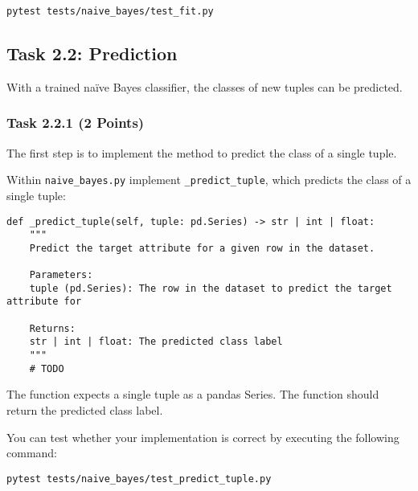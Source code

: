 \documentclass[
english,
smallborders
]{i6prcsht}
\newcommand{\points}[1]{\hfill \color{red}(#1 Points)\color{black}}
\begin{document}
\vspace*{0.3cm}

\begin{lstlisting}
pytest tests/naive_bayes/test_fit.py
\end{lstlisting}

\vspace*{0.1cm}

\subsection*{Task 2.2: Prediction}

With a trained naïve Bayes classifier, the classes of new tuples can be predicted.

\subsubsection*{Task 2.2.1 \points{2}}

The first step is to implement the method to predict the class of a single tuple.

Within \texttt{naive\_bayes.py} implement \texttt{\_predict\_tuple}, which predicts the class of a single tuple:

\vspace*{0.3cm}

\begin{lstlisting}
def _predict_tuple(self, tuple: pd.Series) -> str | int | float:
	"""
	Predict the target attribute for a given row in the dataset.

	Parameters:
	tuple (pd.Series): The row in the dataset to predict the target attribute for

	Returns:
	str | int | float: The predicted class label
	"""
	# TODO
\end{lstlisting}

\vspace*{0.1cm}

The function expects a single tuple as a pandas Series. The function should return the predicted class label.

You can test whether your implementation is correct by executing the following command:

\vspace*{0.3cm}

\begin{lstlisting}
pytest tests/naive_bayes/test_predict_tuple.py
\end{lstlisting}

\vspace*{0.1cm}
\end{document}
